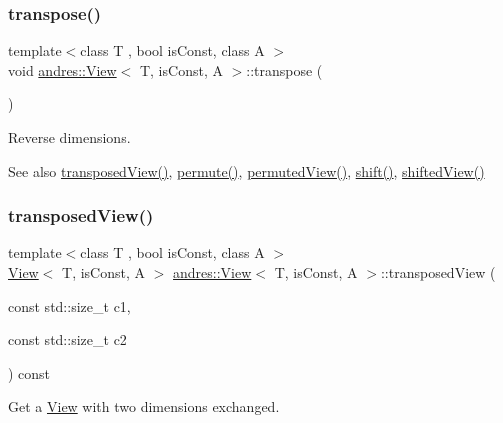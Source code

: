 \subsubsection{\texorpdfstring{transpose()}{transpose()}\hspace{0.1cm}{\footnotesize\ttfamily [2/2]}}
{\footnotesize\ttfamily template$<$class T , bool is\+Const, class A $>$ \\
void \hyperlink{classandres_1_1View}{andres\+::\+View}$<$ T, is\+Const, A $>$\+::transpose (\begin{DoxyParamCaption}{ }\end{DoxyParamCaption})}

Reverse dimensions.

\begin{DoxySeeAlso}{See also}
\hyperlink{classandres_1_1View_a98a4c17bd2faa51788f6fd533a429e73}{transposed\+View()}, \hyperlink{classandres_1_1View_a375d3e199e219568d8a6205e4088289b}{permute()}, \hyperlink{classandres_1_1View_ad5ff9254de815d85b6c6748bad3fcd89}{permuted\+View()}, \hyperlink{classandres_1_1View_a476957393b3b21333bc665e852da47ad}{shift()}, \hyperlink{classandres_1_1View_abc938823dc964548f0f44ab10bca6b59}{shifted\+View()} 
\end{DoxySeeAlso}
\mbox{\label{classandres_1_1View_a98a4c17bd2faa51788f6fd533a429e73}} 
\subsubsection{\texorpdfstring{transposed\+View()}{transposedView()}\hspace{0.1cm}{\footnotesize\ttfamily [1/2]}}
{\footnotesize\ttfamily template$<$class T , bool is\+Const, class A $>$ \\
\hyperlink{classandres_1_1View}{View}$<$ T, is\+Const, A $>$ \hyperlink{classandres_1_1View}{andres\+::\+View}$<$ T, is\+Const, A $>$\+::transposed\+View (\begin{DoxyParamCaption}\item[{const std\+::size\+\_\+t}]{c1,  }\item[{const std\+::size\+\_\+t}]{c2 }\end{DoxyParamCaption}) const\hspace{0.3cm}{\ttfamily [inline]}}

Get a \hyperlink{classandres_1_1View}{View} with two dimensions exchanged.


